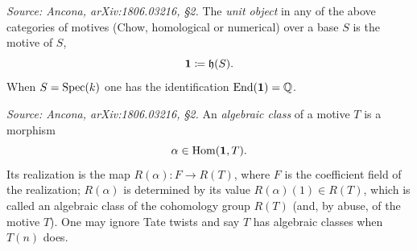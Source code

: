 \begin{definition}
  \label{def:unit-object}
  \textit{Source: Ancona, arXiv:1806.03216, §2.}
  The \emph{unit object} in any of the above categories of motives (Chow,
  homological or numerical) over a base \(S\) is the motive of \(S\),
  \[\mathbf{1} \coloneqq \mathfrak{h}(S).\]
  When \(S = \mathrm{Spec}(k)\) one has the identification \(\mathrm{End}(\mathbf{1}) = \mathbb{Q}\).
\end{definition}

\begin{definition}
  \label{def:algebraic-class}
  \textit{Source: Ancona, arXiv:1806.03216, §2.}
  An \emph{algebraic class} of a motive \(T\) is a morphism
  \[\alpha \in \mathrm{Hom}(\mathbf{1}, T).\]
  Its realization is the map \(R(\alpha) : F \to R(T)\), where \(F\) is the
  coefficient field of the realization; \(R(\alpha)\) is determined by its value
  \(R(\alpha)(1) \in R(T)\), which is called an algebraic class of the cohomology
  group \(R(T)\) (and, by abuse, of the motive \(T\)). One may ignore Tate twists
  and say \(T\) has algebraic classes when \(T(n)\) does.
\end{definition}

